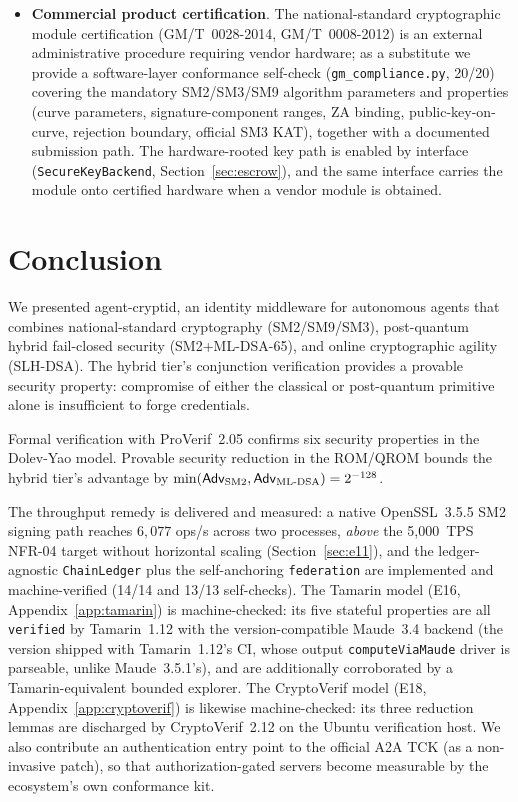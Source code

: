 \documentclass[10pt,twocolumn]{IEEEtran}
\begin{document}
\begin{itemize}
  \item \textbf{Commercial product certification}. The national-standard
    cryptographic module certification (GM/T~0028-2014, GM/T~0008-2012)
    is an external administrative procedure requiring vendor hardware;
    as a substitute we provide a
    software-layer conformance self-check (\texttt{gm\_compliance.py},
    20/20) covering the mandatory SM2/SM3/SM9 algorithm parameters and
    properties (curve parameters, signature-component ranges, ZA
    binding, public-key-on-curve, rejection boundary, official SM3 KAT),
    together with a documented submission path. The hardware-rooted key
    path is enabled by interface (\texttt{SecureKeyBackend},
    Section~\ref{sec:escrow}), and the same interface carries the
    module onto certified hardware when a vendor module is obtained.
\end{itemize}

\section{Conclusion}

We presented agent-cryptid, an identity middleware for autonomous agents
that combines national-standard cryptography (SM2/SM9/SM3), post-quantum
hybrid fail-closed security (SM2+ML-DSA-65), and online cryptographic
agility (SLH-DSA). The hybrid tier's conjunction verification provides
a provable security property: compromise of either the classical or
post-quantum primitive alone is insufficient to forge credentials.

Formal verification with ProVerif~2.05 confirms six security properties
in the Dolev-Yao model. Provable security reduction in the ROM/QROM
bounds the hybrid tier's advantage by $\min(\mathsf{Adv}_{\text{SM2}},
\mathsf{Adv}_{\text{ML\text{-}DSA}}) = 2^{-128}$.

The throughput remedy is delivered and measured: a native OpenSSL~3.5.5
SM2 signing path reaches $6{,}077$ ops/s across two processes,
\emph{above} the 5,000~TPS NFR-04 target without horizontal scaling
(Section~\ref{sec:e11}), and the ledger-agnostic \texttt{ChainLedger}
plus the self-anchoring \texttt{federation} are implemented and
machine-verified (14/14 and 13/13 self-checks). The Tamarin model
(E16, Appendix~\ref{app:tamarin}) is machine-checked: its five
stateful properties are all \texttt{verified} by Tamarin~1.12 with
the version-compatible Maude~3.4 backend (the version shipped with
Tamarin~1.12's CI, whose output \texttt{computeViaMaude} driver is
parseable, unlike Maude~3.5.1's), and are additionally corroborated
by a Tamarin-equivalent bounded explorer. The CryptoVerif
model (E18, Appendix~\ref{app:cryptoverif}) is likewise machine-checked:
its three reduction lemmas are discharged by CryptoVerif~2.12 on the
Ubuntu verification host.
We also contribute an authentication entry point to the official A2A
TCK (as a non-invasive patch), so that authorization-gated servers
become measurable by the ecosystem's own conformance kit.
\end{document}
